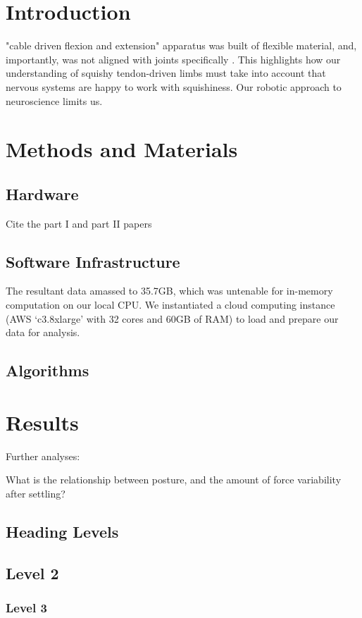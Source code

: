 \documentclass[utf8]{frontiersSCNS} %
\begin{document}
\section{Introduction}

"cable driven flexion and extension" apparatus was built of flexible material, and, importantly, was not aligned with joints specifically \cite{Yi:2018et}. This highlights how our understanding of squishy tendon-driven limbs must take into account that nervous systems are happy to work with squishiness. Our robotic approach to neuroscience limits us.
\section{Methods and Materials}
\subsection{Hardware}
Cite the part I and part II papers
\subsection{Software Infrastructure}
The resultant data amassed to 35.7GB, which was untenable for in-memory computation on our local CPU. We instantiated a cloud computing instance (AWS `c3.8xlarge' with 32 cores and 60GB of RAM) to load and prepare our data for analysis.
\subsection{Algorithms}
\section{Results}
Further analyses:

What is the relationship between posture, and the amount of force variability after settling?


\subsection{Heading Levels}


\subsection{Level 2}
\subsubsection{Level 3}
\end{document}
